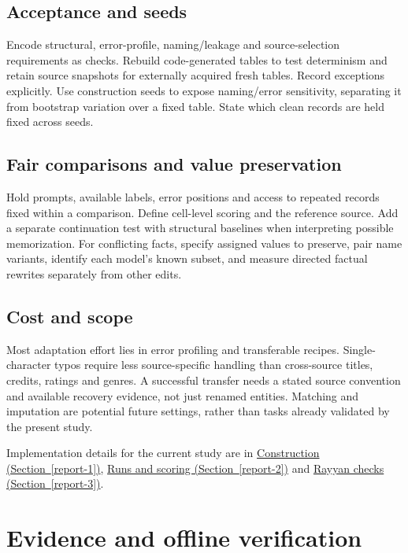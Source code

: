 \documentclass[10pt,a4paper]{article}
\begin{document}
\subsection{Acceptance and seeds}

Encode structural, error-profile, naming/leakage and source-selection requirements as checks. Rebuild code-generated tables to test determinism and retain source snapshots for externally acquired fresh tables. Record exceptions explicitly. Use construction seeds to expose naming/error sensitivity, separating it from bootstrap variation over a fixed table. State which clean records are held fixed across seeds.

\subsection{Fair comparisons and value preservation}

Hold prompts, available labels, error positions and access to repeated records fixed within a comparison. Define cell-level scoring and the reference source. Add a separate continuation test with structural baselines when interpreting possible memorization. For conflicting facts, specify assigned values to preserve, pair name variants, identify each model's known subset, and measure directed factual rewrites separately from other edits.

\subsection{Cost and scope}

Most adaptation effort lies in error profiling and transferable recipes. Single-character typos require less source-specific handling than cross-source titles, credits, ratings and genres. A successful transfer needs a stated source convention and available recovery evidence, not just renamed entities. Matching and imputation are potential future settings, rather than tasks already validated by the present study.

Implementation details for the current study are in \hyperlink{companion-1}{Construction (Section~\ref{report-1})}, \hyperlink{companion-2}{Runs and scoring (Section~\ref{report-2})} and \hyperlink{companion-3}{Rayyan checks (Section~\ref{report-3})}.
\clearpage
\section{Evidence and offline verification}
\hypertarget{companion-5}{}\label{report-5}
\end{document}
